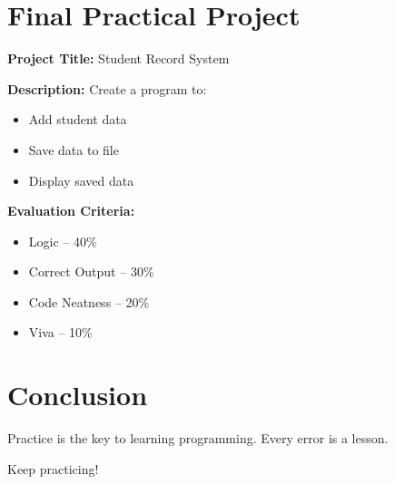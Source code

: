 \newpage
\section*{Final Practical Project}

\textbf{Project Title:} Student Record System

\textbf{Description:}  
Create a program to:
\begin{itemize}
    \item Add student data
    \item Save data to file
    \item Display saved data
\end{itemize}

\textbf{Evaluation Criteria:}
\begin{itemize}
    \item Logic – 40\%
    \item Correct Output – 30\%
    \item Code Neatness – 20\%
    \item Viva – 10\%
\end{itemize}

\section*{Conclusion}

Practice is the key to learning programming.
Every error is a lesson.

Keep practicing!